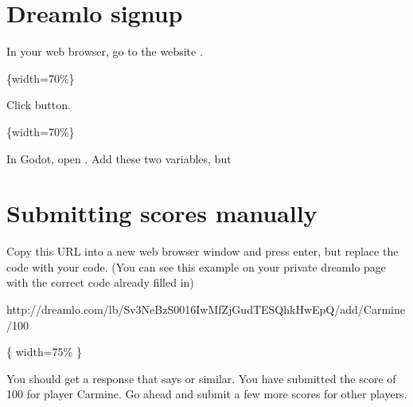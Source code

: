 \documentclass[letterpaper,10pt,english]{sphinxmanual}
\begin{document}
\section{Dreamlo sign\sphinxhyphen{}up}
\label{\detokenize{pandoc_tut:dreamlo-sign-up}}
\sphinxAtStartPar
In your web browser, go to the website .

\sphinxAtStartPar
{}\{width=70\%\}

\sphinxAtStartPar
Click  button.

\sphinxAtStartPar
{}\{width=70\%\}

\sphinxAtStartPar
In Godot, open .  Add these two variables, but 

\begin{sphinxVerbatim}[commandchars=\\\{\}]
   
   
\end{sphinxVerbatim}


\section{Submitting scores manually}
\label{\detokenize{pandoc_tut:submitting-scores-manually}}
\sphinxAtStartPar
Copy this URL into a new web browser window and press enter, but replace the code with your
 code.  (You can see this example on your private dreamlo page with the correct
code already filled in)

\begin{sphinxVerbatim}[commandchars=\\\{\}]
http://dreamlo.com/lb/Sv3NeBzS0016IwMfZjGudTESQhkHwEpQ/add/Carmine/100
\end{sphinxVerbatim}

\sphinxAtStartPar
{}\{ width=75\% \}

\sphinxAtStartPar
You should get a response that says  or similar.  You have submitted the score of 100 for player Carmine.
Go ahead and submit a few more scores for other players.
\end{document}

